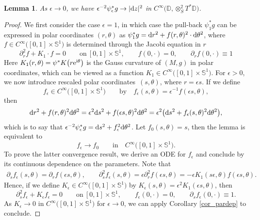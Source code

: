 \documentclass[pdftex]{sigma}
\numberwithin{equation}{section}
\newtheorem{Lemma}[Theorem]{Lemma}
\theoremstyle{definition}
\newcommand{\DD}{\mathbb{D}} %
\newcommand{\1}{{\bf 1}}
\begin{document}
\begin{Lemma}\label{lem_convtoeuclid}
As $\epsilon \rightarrow 0$, we have $\epsilon^{-2} \psi_\epsilon^*g \rightarrow |{\rm d}z|^2$ in $C^\infty\bigl(\DD,\otimes_S^2T^*\DD\bigr)$.
\end{Lemma}

\begin{proof}
We first consider the case $\epsilon =1$, in which case the pull-back $\psi_1^*g$ can be expressed in polar coordinates $(r,\theta)$ as
$\psi_1^*g = {\rm d}r^2 + f(r,\theta)^2 \cdot {\rm d}\theta^2$,
where $f\in C^\infty\bigl([0,1]\times \mathbb S^1\bigr)$ is determined through the Jacobi equation in $r$
\[
		\partial_r^2f + K_1\cdot f = 0 \qquad\text{on} \  [0,1]\times \mathbb S^1, \qquad f(0,\cdot) =0,\qquad \partial_{r}f(0,\cdot) \equiv 1
	\]
Here $K_1(r,\theta)=\psi^*K\bigl(r{\rm e}^{{\rm i}\theta}\bigr)$ is the Gauss curvature of $(M,g)$ in polar coordinates, which can be viewed as a function $K_1\in C^\infty\bigl([0,1]\times \mathbb S^1\bigr)
$. For $\epsilon>0$, we now introduce rescaled polar coordinates~$(s,\theta)$, where $r=\epsilon s$. If we define
\[
	f_\epsilon\in C^\infty\bigl([0,1]\times\mathbb S^1\bigr)\qquad \text{by}\quad f_\epsilon(s,\theta)=\epsilon^{-1}f(\epsilon s,\theta),
\]
then
\[
	{\rm d}r^2 + f(r,\theta)^2 {\rm d}\theta^2 = \epsilon^2 {\rm d}s^2 + f(\epsilon s,\theta)^2 {\rm d}\theta^2 = \epsilon^2\bigl({\rm d}s^2 + f_\epsilon(s,\theta)^2{\rm d}\theta^2\bigr),
\]
which is to say that $\epsilon^{-2} \psi_\epsilon^* g = {\rm d}s^2 + f_\epsilon^2 {\rm d}\theta^2$. Let $f_0(s,\theta)=s$, then the lemma is equivalent to
\[
	f_\epsilon \rightarrow f_0 \qquad \text{in}\quad C^\infty\bigl([0,1]\times \mathbb S^1\bigr).
\]
To prove the latter convergence result, we derive an ODE for $f_\epsilon$ and conclude by its continuous dependence on the parameters. Note that
\begin{gather*}
	\partial_s f_\epsilon(s,\theta)=\partial_r f(\epsilon s,\theta),\qquad
\partial_s^2f_\epsilon(s,\theta) =\epsilon \partial_r^2f(\epsilon s,\theta)= - \epsilon K_1(s\epsilon,\theta) f(\epsilon s,\theta).
\end{gather*}
Hence, if we define $K_\epsilon \in C^\infty\bigl([0,1]\times \mathbb S^1\bigr)$ by $K_\epsilon(s,\theta)=\epsilon^2 K_1(\epsilon s,\theta)$, then
\[
		\partial_s^2f_\epsilon + K_\epsilon f_\epsilon = 0 \qquad\text{on} \  [0,1]\times \mathbb S^1, \qquad f_\epsilon(0,\cdot) =0,\qquad \partial_{s}f_\epsilon(0,\cdot) \equiv 1.
	\]
As $K_\epsilon\rightarrow 0$ in $C^\infty\bigl([0,1]\times \mathbb S^1\bigr)$ for $\epsilon\rightarrow 0$, we can apply Corollary \ref{cor_pardep} to conclude.
\end{proof}
\end{document}
